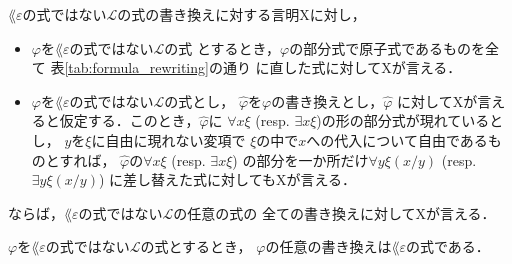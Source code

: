 	\begin{screen}
		\begin{metaaxm}[式の書き換えに関する構造的帰納法の原理]
		\label{metaaxm:induction_principle_of_formula_rewriting}
			$\lang{\varepsilon}$の式ではない$\mathcal{L}$の式の書き換えに対する言明Xに対し，
			\begin{itemize}
				\item $\varphi$を$\lang{\varepsilon}$の式ではない$\mathcal{L}$の式
					とするとき，$\varphi$の部分式で原子式であるものを全て
					表\ref{tab:formula_rewriting}の通り
					に直した式に対してXが言える．
					
				\item $\varphi$を$\lang{\varepsilon}$の式ではない$\mathcal{L}$の式とし，
					$\widehat{\varphi}$を$\varphi$の書き換えとし，$\widehat{\varphi}$
					に対してXが言えると仮定する．このとき，$\widehat{\varphi}$に
					$\forall x \xi$ (resp. $\exists x \xi$)の形の部分式が現れているとし，
					$y$を$\xi$に自由に現れない変項で
					$\xi$の中で$x$への代入について自由であるものとすれば，
					$\widehat{\varphi}$の$\forall x \xi$ (resp. $\exists x \xi$)
					の部分を一か所だけ$\forall y \xi(x/y)$ (resp. $\exists y \xi(x/y)$)
					に差し替えた式に対してもXが言える．
			\end{itemize}
			ならば，$\lang{\varepsilon}$の式ではない$\mathcal{L}$の任意の式の
			全ての書き換えに対してXが言える．
		\end{metaaxm}
	\end{screen}
	
	\begin{screen}
		\begin{metathm}
		\label{metathm:rewritten_formulas_are_of_L_epsilon}
			$\varphi$を$\lang{\varepsilon}$の式ではない$\mathcal{L}$の式とするとき，
			$\varphi$の任意の書き換えは$\lang{\varepsilon}$の式である．
		\end{metathm}
	\end{screen}
	
